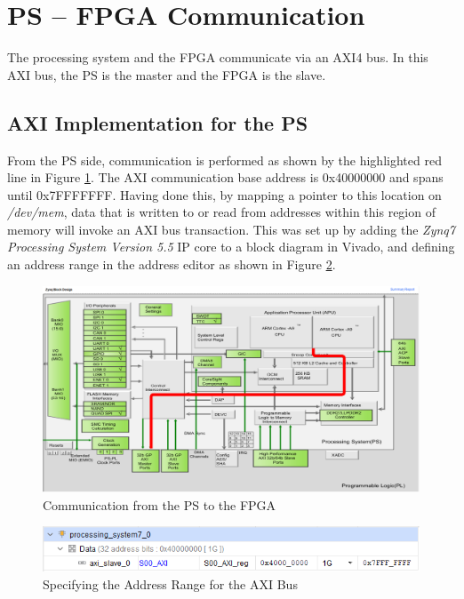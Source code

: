 \section{PS -- FPGA Communication}\label{az-com}

The processing system and the FPGA communicate via an AXI4 bus. In this AXI bus, the PS is the master and the FPGA is the slave. 

\subsection{AXI Implementation for the PS}
From the PS side, communication is performed as shown by the highlighted red line in Figure \ref{ps-con}. The AXI communication base address is 0x40000000 and spans until 0x7FFFFFFF. Having done this, by mapping a pointer to this location on \textit{/dev/mem}, data that is written to or read from addresses within this region of memory will invoke an AXI bus transaction. This was set up by adding the \textit{Zynq7 Processing System Version 5.5} IP core to a block diagram in Vivado, and defining an address range in the address editor as shown in Figure \ref{addr-editor}. 

\begin{figure}
	\centering 
	\includegraphics[width=\textwidth]{figures/ps-pl-conn}
	\caption{Communication from the PS to the FPGA}\label{ps-con}
\end{figure}

\begin{figure}
	\centering 
	\includegraphics[width=\textwidth]{figures/address_editor}
	\caption{Specifying the Address Range for the AXI Bus}\label{addr-editor}
\end{figure}

